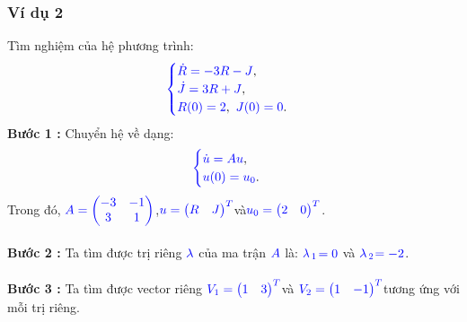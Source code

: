 \documentclass[a4paper]{article}
\begin{document}
\subsubsection{Ví dụ 2}
Tìm nghiệm của hệ phương trình:
\begin{align}
	    \textcolor{blue}{
	    \begin{cases}
            \dot R = -3R - J \textcolor{black}{,}\\
            \dot J = 3R + J \textcolor{black}{,}\\
            R(0) = 2\textcolor{black}{,} \enskip J(0) = 0 \textcolor{black}{.}
        \end{cases}
        }
        \notag
	\end{align}
{\bfseries Bước 1 :} Chuyển hệ về dạng:
\begin{align}
	    \textcolor{blue}{
	    \begin{cases}
            \dot u = Au \textcolor{black}{,}\\
            u(0) = u\sb{0}\textcolor{black}{.}
        \end{cases}
        }
        \notag
	\end{align}
Trong đó,  $\textcolor{blue}{A = \begin{pmatrix} -3 & -1\\ 3 & 1 \end{pmatrix}}$,\enskip $\textcolor{blue}{u = \begin{pmatrix} R & J \end{pmatrix}\sp{T}}$\enskip và\enskip $\textcolor{blue}{u\sb{0} = \begin{pmatrix} 2 & 0 \end{pmatrix}\sp{T}}$.\\\\
{\bfseries Bước 2 :} Ta tìm được trị riêng $\textcolor{blue}{\lambda}$ của ma trận $\textcolor{blue}{A}$ là: $\textcolor{blue}{\lambda}$$\textcolor{blue}{\sb{1}}$$\textcolor{blue}{=0}$ và $\textcolor{blue}{\lambda}$$\textcolor{blue}{\sb{2}}$$\textcolor{blue}{=-2}$.\\\\
{\bfseries Bước 3 :} Ta tìm được vector riêng \enskip $\textcolor{blue}{V\sb{1} = \begin{pmatrix} 1 & 3 \end{pmatrix}\sp{T}}$\enskip và \enskip $\textcolor{blue}{V\sb{2} = \begin{pmatrix} 1 & -1 \end{pmatrix}\sp{T}}$\enskip tương ứng với mỗi trị riêng.\\\\
\end{document}
